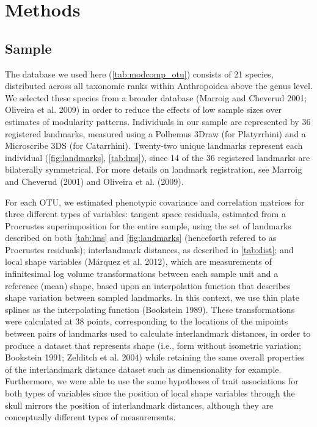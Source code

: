 \documentclass[12pt,]{article}
\begin{document}
\section{Methods}\label{methods}

\subsection{Sample}\label{sample}

The database we used here (\autoref{tab:modcomp_otu}) consists of 21
species, distributed across all taxonomic ranks within Anthropoidea
above the genus level. We selected these species from a broader database
(Marroig and Cheverud 2001; Oliveira et al. 2009) in order to reduce the
effects of low sample sizes over estimates of modularity patterns.
Individuals in our sample are represented by 36 registered landmarks,
measured using a Polhemus 3Draw (for Platyrrhini) and a Microscribe 3DS
(for Catarrhini). Twenty-two unique landmarks represent each individual
(\autoref{fig:landmarks}, \autoref{tab:lms}), since 14 of the 36
registered landmarks are bilaterally symmetrical. For more details on
landmark registration, see Marroig and Cheverud (2001) and Oliveira et
al. (2009).



For each OTU, we estimated phenotypic covariance and correlation
matrices for three different types of variables: tangent space
residuals, estimated from a Procrustes superimposition for the entire
sample, using the set of landmarks described on both \autoref{tab:lms}
and \autoref{fig:landmarks} (henceforth refered to as Procrustes
residuals); interlandmark distances, as described in \autoref{tab:dist};
and local shape variables (Márquez et al. 2012), which are measurements
of infinitesimal log volume transformations between each sample unit and
a reference (mean) shape, based upon an interpolation function that
describes shape variation between sampled landmarks. In this context, we
use thin plate splines as the interpolating function (Bookstein 1989).
These transformations were calculated at 38 points, corresponding to the
locations of the mipoints between pairs of landmarks used to calculate
interlandmark distances, in order to produce a dataset that represents
shape (i.e., form without isometric variation; Bookstein 1991; Zelditch
et al. 2004) while retaining the same overall properties of the
interlandmark distance dataset such as dimensionality for example.
Furthermore, we were able to use the same hypotheses of trait
associations for both types of variables since the position of local
shape variables through the skull mirrors the position of interlandmark
distances, although they are conceptually different types of
measurements.
\end{document}

